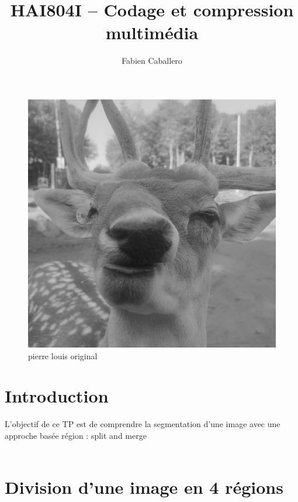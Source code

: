 \documentclass{article}
\title{HAI804I – Codage et compression multimédia
}
\author{Fabien Caballero}
\begin{document}
\maketitle
    \tableofcontents

\newpage

\begin{figure}[h]
\centerline{\includegraphics[scale=0.5]{./pierrelouis.png}}
\caption{pierre louis original}
\end{figure}

\section*{Introduction}
L'objectif de ce TP est de comprendre la segmentation d’une image avec une approche basée
région : split and merge
\\\\
\newpage
\section{Division d'une image en 4 régions}
\end{document}
